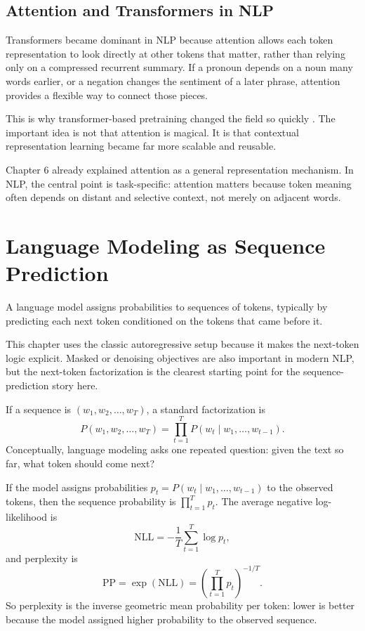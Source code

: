 \subsection{Attention and Transformers in NLP}

Transformers became dominant in NLP because attention allows each token representation to look directly at other tokens that matter, rather than relying only on a compressed recurrent summary. If a pronoun depends on a noun many words earlier, or a negation changes the sentiment of a later phrase, attention provides a flexible way to connect those pieces.

This is why transformer-based pretraining changed the field so quickly \citep{vaswani2017,devlin2019}. The important idea is not that attention is magical. It is that contextual representation learning became far more scalable and reusable.

\begin{advancednote}
Chapter 6 already explained attention as a general representation mechanism. In NLP, the central point is task-specific: attention matters because token meaning often depends on distant and selective context, not merely on adjacent words.
\end{advancednote}

\section{Language Modeling as Sequence Prediction}

\begin{definition}
A language model assigns probabilities to sequences of tokens, typically by predicting each next token conditioned on the tokens that came before it.
\end{definition}

This chapter uses the classic autoregressive setup because it makes the next-token logic explicit. Masked or denoising objectives are also important in modern NLP, but the next-token factorization is the clearest starting point for the sequence-prediction story here.

If a sequence is $(w_1, w_2, \ldots, w_T)$, a standard factorization is
\[
P(w_1, w_2, \ldots, w_T) = \prod_{t=1}^{T} P(w_t \mid w_1, \ldots, w_{t-1}).
\]
Conceptually, language modeling asks one repeated question: given the text so far, what token should come next?

\begin{mathlens}
If the model assigns probabilities \(p_t=P(w_t\mid w_1,\ldots,w_{t-1})\) to the observed tokens, then the sequence probability is \(\prod_{t=1}^T p_t\). The average negative log-likelihood is
\[
\mathrm{NLL}=-\frac{1}{T}\sum_{t=1}^T \log p_t,
\]
and perplexity is
\[
\mathrm{PP}=\exp(\mathrm{NLL})=\left(\prod_{t=1}^T p_t\right)^{-1/T}.
\]
So perplexity is the inverse geometric mean probability per token: lower is better because the model assigned higher probability to the observed sequence.
\end{mathlens}

